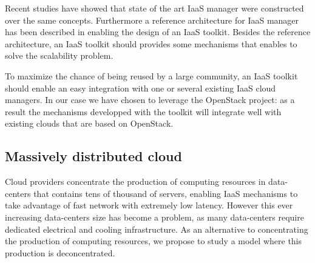 Recent studies have showed that state of the art IaaS manager \cite{peng:2009}
were constructed over the same concepts. Furthermore a reference architecture 
for IaaS manager has been described in \cite{moreno2012iaas} enabling the design
of an IaaS toolkit. Besides the reference architecture, an IaaS toolkit should
provides some mechanisms that enables to solve the scalability problem.

To maximize the chance of being reused by a large community, an IaaS toolkit 
should enable an easy integration with one or several existing IaaS cloud
managers. In our case we have chosen to leverage the OpenStack project: as a 
result the mechanisms developped with the toolkit will integrate well with 
existing clouds that are based on OpenStack.



\subsection{Massively distributed cloud}









Cloud providers concentrate the production of computing resources in 
data-centers that contains tens of thousand of servers, enabling IaaS mechanisms
to take advantage of fast network with extremely low latency. However this ever 
increasing data-centers size has become a problem, as many data-centers require 
dedicated electrical and cooling infrastructure. As an alternative to 
concentrating the production of computing resources, we propose to study a model
where this production is deconcentrated.

